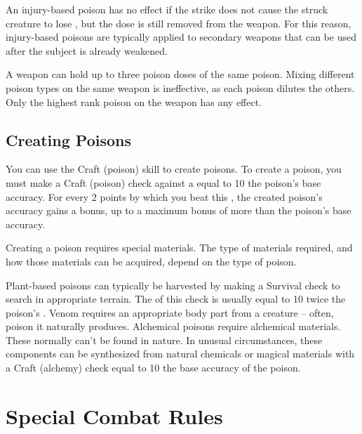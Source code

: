         An injury-based poison has no effect if the strike does not cause the struck creature to lose , but the dose is still removed from the weapon.
        For this reason, injury-based poisons are typically applied to secondary weapons that can be used after the subject is already weakened.

        A weapon can hold up to three poison doses of the same poison.
        Mixing different poison types on the same weapon is ineffective, as each poison dilutes the others.
        Only the highest rank poison on the weapon has any effect.

    \subsection{Creating Poisons}\label{Creating Poisons}

        You can use the Craft (poison) skill to create poisons.
        To create a poison, you must make a Craft (poison) check against a  equal to 10 \add the poison's base accuracy.
        For every 2 points by which you beat this , the created poison's accuracy gains a  bonus, up to a maximum bonus of  more than the poison's base accuracy.

        Creating a poison requires special materials.
        The type of materials required, and how those materials can be acquired, depend on the type of poison.

        \begin{itemize}
             Plant-based poisons can typically be harvested by making a Survival check to search in appropriate terrain.
                The  of this check is usually equal to 10 \add twice the poison's .
             Venom requires an appropriate body part from a creature -- often, poison it naturally produces.
             Alchemical poisons require alchemical materials.
                These normally can't be found in nature.
                In unusual circumstances, these components can be synthesized from natural chemicals or magical materials with a Craft (alchemy) check equal to 10 \add the base accuracy of the poison.
        \end{itemize}

\section{Special Combat Rules}

